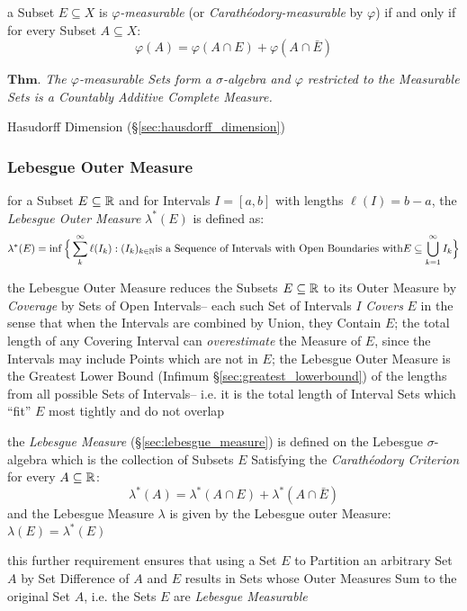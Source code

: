 a Subset $E \subseteq X$ is \emph{$\varphi$-measurable} (or
\emph{Carath\'eodory-measurable} by $\varphi$) if and only if for every Subset
$A \subseteq X$:
\[
  \varphi(A) = \varphi(A \cap E) + \varphi(A \cap \bar{E})
\]

$\textbf{Thm.}$ \emph{
  The $\varphi$-measurable Sets form a $\sigma$-algebra and $\varphi$ restricted
  to the Measurable Sets is a Countably Additive Complete Measure.
}

Hasudorff Dimension (\S\ref{sec:hausdorff_dimension})



\subsubsection{Lebesgue Outer Measure}\label{sec:lebesgue_outer_measure}

for a Subset $E \subseteq \mathbb{R}$ and for Intervals $I = [a,b]$ with lengths
$\ell(I) = b-a$, the \emph{Lebesgue Outer Measure} $\lambda^*(E)$ is defined as:
\[
  \lambda^*(E) = \inf \Big\{ \sum_k^\infty \ell(I_k) : (I_k)_{k \in \mathbb{N}}
    \text{is a Sequence of Intervals with Open Boundaries with}
    E \subseteq \bigcup_{k=1}^\infty I_k \Big\}
\]

the Lebesgue Outer Measure reduces the Subsets $E \subseteq \mathbb{R}$ to its Outer
Measure by \emph{Coverage} by Sets of Open Intervals-- each such Set of
Intervals $I$ \emph{Covers} $E$ in the sense that when the Intervals are
combined by Union, they Contain $E$; the total length of any Covering Interval
can \emph{overestimate} the Measure of $E$, since the Intervals may include
Points which are not in $E$; the Lebesgue Outer Measure is the Greatest Lower
Bound (Infimum \S\ref{sec:greatest_lowerbound}) of the lengths from all possible
Sets of Intervals-- i.e. it is the total length of Interval Sets which ``fit''
$E$ most tightly and do not overlap

the \emph{Lebesgue Measure} (\S\ref{sec:lebesgue_measure}) is defined on the
Lebesgue $\sigma$-algebra which is the collection of Subsets $E$ Satisfying the
\emph{Carath\'eodory Criterion} for every $A \subseteq \mathbb{R}$:
\[
  \lambda^*(A) = \lambda^*(A \cap E) + \lambda^*(A \cap \bar{E})
\]
and the Lebesgue Measure $\lambda$ is given by the Lebesgue outer Measure:
$\lambda(E) = \lambda^*(E)$

this further requirement ensures that using a Set $E$ to Partition an arbitrary
Set $A$ by Set Difference of $A$ and $E$ results in Sets whose Outer Measures
Sum to the original Set $A$, i.e. the Sets $E$ are \emph{Lebesgue Measurable}



